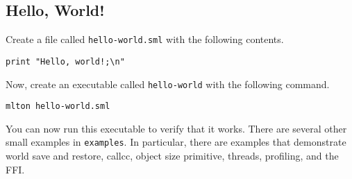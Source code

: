 \subsection{Hello, World!}

Create a file called {\tt hello-world.sml} with the following contents.

\begin{verbatim}
print "Hello, world!;\n"
\end{verbatim}
Now, create an executable called {\tt hello-world} with the following command.
\begin{verbatim}
mlton hello-world.sml
\end{verbatim}
You can now run this executable to verify that it works.  There are several
other small examples in {\tt examples}.  In particular, there are examples that
demonstrate world save and restore, callcc, object size primitive, threads,
profiling, and the FFI.

